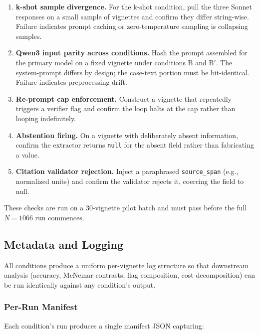 \begin{enumerate}\setlength\itemsep{2pt}
  \item \textbf{k-shot sample divergence.} For the k-shot condition,
        pull the three Sonnet responses on a small sample of vignettes
        and confirm they differ string-wise. Failure indicates prompt
        caching or zero-temperature sampling is collapsing samples.
  \item \textbf{Qwen3 input parity across conditions.} Hash the
        prompt assembled for the primary model on a fixed vignette
        under conditions B and B$'$. The system-prompt differs by
        design; the case-text portion must be bit-identical. Failure
        indicates preprocessing drift.
  \item \textbf{Re-prompt cap enforcement.} Construct a vignette that
        repeatedly triggers a verifier flag and confirm the loop
        halts at the cap rather than looping indefinitely.
  \item \textbf{Abstention firing.} On a vignette with deliberately
        absent information, confirm the extractor returns
        \texttt{null} for the absent field rather than fabricating
        a value.
  \item \textbf{Citation validator rejection.} Inject a paraphrased
        \texttt{source\_span} (e.g., normalized units) and confirm
        the validator rejects it, coercing the field to null.
\end{enumerate}

These checks are run on a 30-vignette pilot batch and must pass
before the full $N=1066$ run commences.

\subsection{Metadata and Logging}
\label{app:logging}

All conditions produce a uniform per-vignette log structure so that
downstream analysis (accuracy, McNemar contrasts, flag composition,
cost decomposition) can be run identically against any condition's
output.

\subsubsection{Per-Run Manifest}

Each condition's run produces a single manifest JSON capturing:

